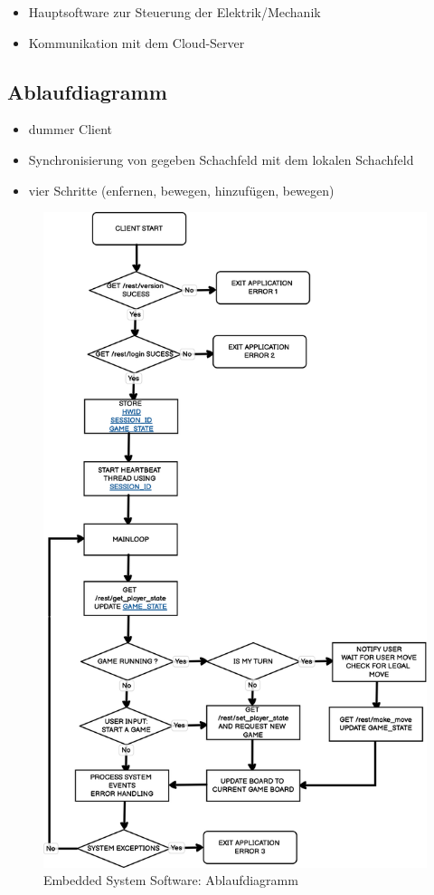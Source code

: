 \begin{itemize}
\tightlist
\item
  Hauptsoftware zur Steuerung der Elektrik/Mechanik
\item
  Kommunikation mit dem Cloud-Server
\end{itemize}

\hypertarget{ablaufdiagramm}{%
\subsection{Ablaufdiagramm}\label{ablaufdiagramm}}

\begin{itemize}
\item
  dummer Client
\item
  Synchronisierung von gegeben Schachfeld mit dem lokalen Schachfeld
\item
  vier Schritte (enfernen, bewegen, hinzufügen, bewegen)
\end{itemize}

\begin{figure}
\centering
\includegraphics{images/ATC_gameclient_statemachiene.png}
\caption{Embedded System Software: Ablaufdiagramm}
\end{figure}

